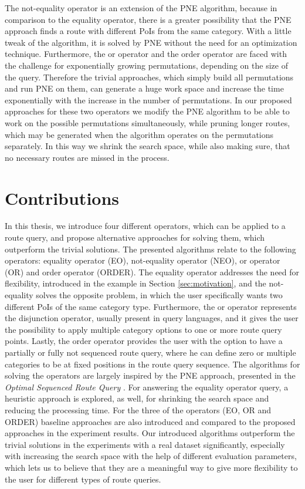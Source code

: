 The not-equality operator is an extension of the PNE algorithm, because in comparison to the equality operator, there is a greater possibility that the PNE approach finds a route with different PoIs from the same category. With a little tweak of the algorithm, it is solved by PNE without the need for an optimization technique.\newline
Furthermore, the or operator and the order operator are faced with the challenge for exponentially growing permutations, depending on the size of the query. Therefore the trivial approaches, which simply build all permutations and run PNE on them, can generate a huge work space and increase the time exponentially with the increase in the number of permutations. In our proposed approaches for these two operators we modify the PNE algorithm to be able to work on the possible permutations simultaneously, while pruning longer routes, which may be generated when the algorithm operates on the  permutations separately. In this way we shrink the search space, while also making sure, that no necessary routes are missed in the process.

\section{Contributions}
In this thesis, we introduce four different operators, which can be applied to a route query, and propose alternative approaches for solving them, which outperform the trivial solutions. The presented algorithms relate to the following operators: equality operator (EO), not-equality operator (NEO), or operator (OR) and order operator (ORDER). The equality operator addresses the need for flexibility, introduced in the example in Section \ref{sec:motivation}, and the not-equality solves the opposite problem, in which the user specifically wants two different PoIs of the same category type. Furthermore, the or operator represents the disjunction operator, usually present in query languages, and it gives the user the possibility to apply multiple category options to one or more route query points. Lastly, the order operator provides the user with the option to have a partially or fully not sequenced route query, where he can define zero or multiple categories to be at fixed positions in the route query sequence. \newline
The algorithms for solving the operators are largely inspired by the PNE approach, presented in the \textit{Optimal Sequenced Route Query} \cite{OSR}. For answering the equality operator query, a heuristic approach is explored, as well, for shrinking the search space and reducing the processing time. For the three of the operators (EO, OR and ORDER) baseline approaches are also introduced and compared to the proposed approaches in the experiment results. Our introduced algorithms outperform the trivial solutions in the experiments with a real dataset significantly, especially with increasing the search space with the help of different evaluation parameters, which lets us to believe that they are a meaningful way to give more flexibility to the user for different types of route queries. 

